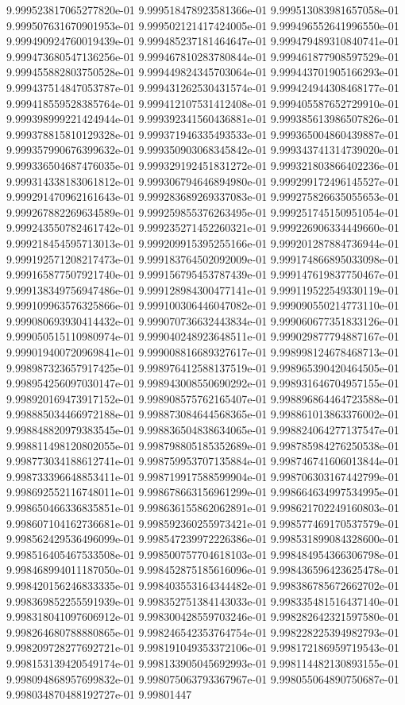 	9.999523817065277820e-01	9.999518478923581366e-01	9.999513083981657058e-01	9.999507631670901953e-01	9.999502121417424005e-01	9.999496552641996550e-01	9.999490924760019439e-01	9.999485237181464647e-01	9.999479489310840741e-01	9.999473680547136256e-01	9.999467810283780844e-01	9.999461877908597529e-01	9.999455882803750528e-01	9.999449824345703064e-01	9.999443701905166293e-01	9.999437514847053787e-01	9.999431262530431574e-01	9.999424944308468177e-01	9.999418559528385764e-01	9.999412107531412408e-01	9.999405587652729910e-01	9.999398999221424944e-01	9.999392341560436881e-01	9.999385613986507826e-01	9.999378815810129328e-01	9.999371946335493533e-01	9.999365004860439887e-01	9.999357990676399632e-01	9.999350903068345842e-01	9.999343741314739020e-01	9.999336504687476035e-01	9.999329192451831272e-01	9.999321803866402236e-01	9.999314338183061812e-01	9.999306794646894980e-01	9.999299172496145527e-01	9.999291470962161643e-01	9.999283689269337083e-01	9.999275826635055653e-01	9.999267882269634589e-01	9.999259855376263495e-01	9.999251745150951054e-01	9.999243550782461742e-01	9.999235271452260321e-01	9.999226906334449660e-01	9.999218454595713013e-01	9.999209915395255166e-01	9.999201287884736944e-01	9.999192571208217473e-01	9.999183764502092009e-01	9.999174866895033098e-01	9.999165877507921740e-01	9.999156795453787439e-01	9.999147619837750467e-01	9.999138349756947486e-01	9.999128984300477141e-01	9.999119522549330119e-01	9.999109963576325866e-01	9.999100306446047082e-01	9.999090550214773110e-01	9.999080693930414432e-01	9.999070736632443834e-01	9.999060677351833126e-01	9.999050515110980974e-01	9.999040248923648511e-01	9.999029877794887167e-01	9.999019400720969841e-01	9.999008816689327617e-01	9.998998124678468713e-01	9.998987323657917425e-01	9.998976412588137519e-01	9.998965390420464505e-01	9.998954256097030147e-01	9.998943008550690292e-01	9.998931646704957155e-01	9.998920169473917152e-01	9.998908575762165407e-01	9.998896864464723588e-01	9.998885034466972188e-01	9.998873084644568365e-01	9.998861013863376002e-01	9.998848820979383545e-01	9.998836504838634065e-01	9.998824064277137547e-01	9.998811498120802055e-01	9.998798805185352689e-01	9.998785984276250538e-01	9.998773034188612741e-01	9.998759953707135884e-01	9.998746741606013844e-01	9.998733396648853411e-01	9.998719917588599904e-01	9.998706303167442799e-01	9.998692552116748011e-01	9.998678663156961299e-01	9.998664634997534995e-01	9.998650466336835851e-01	9.998636155862062891e-01	9.998621702249160803e-01	9.998607104162736681e-01	9.998592360255973421e-01	9.998577469170537579e-01	9.998562429536496099e-01	9.998547239972226386e-01	9.998531899084328600e-01	9.998516405467533508e-01	9.998500757704618103e-01	9.998484954366306798e-01	9.998468994011187050e-01	9.998452875185616096e-01	9.998436596423625478e-01	9.998420156246833335e-01	9.998403553164344482e-01	9.998386785672662702e-01	9.998369852255591939e-01	9.998352751384143033e-01	9.998335481516437140e-01	9.998318041097606912e-01	9.998300428559703246e-01	9.998282642321597580e-01	9.998264680788880865e-01	9.998246542353764754e-01	9.998228225394982793e-01	9.998209728277692721e-01	9.998191049353372106e-01	9.998172186959719543e-01	9.998153139420549174e-01	9.998133905045692993e-01	9.998114482130893155e-01	9.998094868957699832e-01	9.998075063793367967e-01	9.998055064890750687e-01	9.998034870488192727e-01	9.99801447